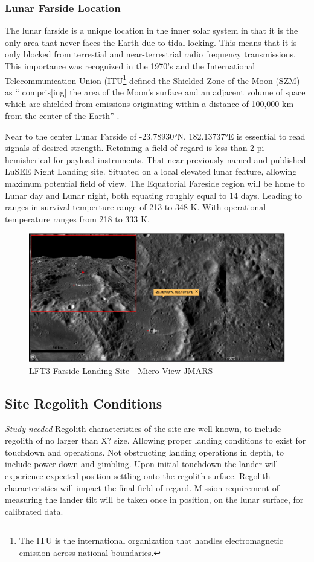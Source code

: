 \subsubsection{Lunar Farside Location}
The lunar farside is a unique location in the inner solar system in that it is the only area that never faces the Earth due to tidal locking.  This means that it is only blocked from terrestial and near-terrestrial radio frequency transmissions.  This importance was recognized in the 1970's and the International Telecommunication Union (ITU\footnote{The ITU is the international organization that handles electromagnetic emission across national boundaries.} defined the Shielded Zone of the Moon (SZM) as “ compris[ing] the area of the Moon’s surface and an adjacent volume of space which are shielded from emissions originating within a distance of 100,000 km from the center of the Earth” \citep{ITU REGULATION}.

Near to the center Lunar Farside of -23.78930°N, 182.13737°E is essential to read signals of desired strength. Retaining a field of regard is less than 2 pi hemisherical for payload instruments. That near previously named and published LuSEE Night Landing site. Situated on a local elevated lunar feature, allowing maximum potential field of view. The Equatorial Fareside region will be home to Lunar day and Lunar night, both equating roughly equal to 14 days. Leading to ranges in survival temperture range of 213 to 348 K. With operational temperature ranges from 218 to 333 K.

    
\begin{figure}
	\centering
	\includegraphics[width=\linewidth]{figures/Landing site overview.PNG}
	\caption{LFT3 Farside Landing Site - Micro View JMARS}
\end{figure}


\subsection{Site Regolith Conditions}
\textit{Study needed}
Regolith characteristics of the site are well known, to include regolith of no larger than X? size. Allowing proper landing conditions to exist for touchdown and operations. Not obstructing landing operations in depth, to include power down and gimbling. Upon initial touchdown the lander will experience expected position settling onto the regolith surface. Regolith characteristics will impact the final field of regard. Mission requirement of measuring the lander tilt will be taken once in position, on the lunar surface, for calibrated data.